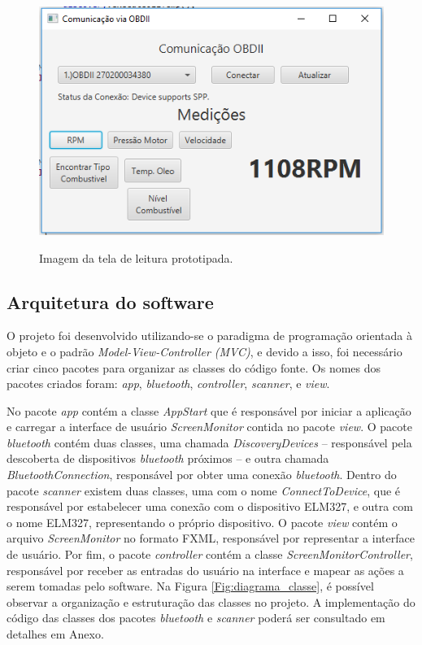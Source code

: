\begin{figure}[!ht]
\centering
\caption{Imagem da tela de leitura prototipada.} 
{\includegraphics[scale=.75]{imagens/telaLeituraJavaFx.png}}\\
 \label{Fig:tela_leitura_javafx}
\end{figure}

\subsection{\textbf{Arquitetura do software}}
O projeto foi desenvolvido utilizando-se o paradigma de programação orientada à objeto e o padrão \textit{Model-View-Controller (MVC)}, e devido a isso, foi necessário criar cinco pacotes para organizar as classes do código fonte. Os nomes dos pacotes criados foram: \textit{app}, \textit{bluetooth}, \textit{controller}, \textit{scanner}, e \textit{view}.

No pacote \textit{app} contém a classe \textit{AppStart} que é responsável por iniciar a aplicação e carregar a interface de usuário \textit{ScreenMonitor} contida no pacote \textit{view}. O pacote \textit{bluetooth} contém duas classes, uma chamada \textit{DiscoveryDevices} – responsável pela descoberta de dispositivos \textit{bluetooth} próximos – e outra chamada \textit{BluetoothConnection}, responsável por obter uma conexão \textit{bluetooth}. Dentro do pacote \textit{scanner} existem duas classes, uma com o nome \textit{ConnectToDevice}, que é responsável por estabelecer uma conexão com o dispositivo ELM327, e outra com o nome ELM327, representando o próprio dispositivo. O pacote \textit{view} contém o arquivo \textit{ScreenMonitor} no formato FXML, responsável por representar a interface de usuário. Por fim, o pacote \textit{controller} contém a classe \textit{ScreenMonitorController}, responsável por receber as entradas do usuário na interface e mapear as ações a serem tomadas pelo software. Na Figura \ref{Fig:diagrama_classe}, é possível observar a organização e estruturação das classes no projeto. A implementação do código das classes dos pacotes \textit{bluetooth} e \textit{scanner} poderá ser consultado em detalhes em Anexo.

